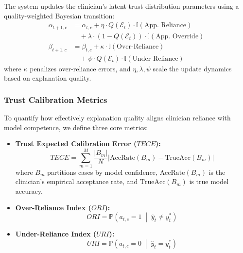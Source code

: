 \documentclass[10pt,journal,compsoc]{IEEEtran}
\begin{document}
The system updates the clinician's latent trust distribution parameters using a quality-weighted Bayesian transition:
\begin{align}
\alpha_{t+1, c} &= \alpha_{t, c} + \eta \cdot Q(\mathcal{E}_t) \cdot \mathbb{I}(\text{App. Reliance}) \nonumber \\
&\quad + \lambda \cdot (1 - Q(\mathcal{E}_t)) \cdot \mathbb{I}(\text{App. Override}) \\
\beta_{t+1, c} &= \beta_{t, c} + \kappa \cdot \mathbb{I}(\text{Over-Reliance}) \nonumber \\
&\quad + \psi \cdot Q(\mathcal{E}_t) \cdot \mathbb{I}(\text{Under-Reliance})
\end{align}
where $\kappa$ penalizes over-reliance errors, and $\eta, \lambda, \psi$ scale the update dynamics based on explanation quality.

\subsubsection{Trust Calibration Metrics}
To quantify how effectively explanation quality aligns clinician reliance with model competence, we define three core metrics:
\begin{itemize}
    \item \textbf{Trust Expected Calibration Error ($TECE$):}
    \begin{equation}
    TECE = \sum_{m=1}^M \frac{|B_m|}{N} \left| \text{AccRate}(B_m) - \text{TrueAcc}(B_m) \right|
    \end{equation}
    where $B_m$ partitions cases by model confidence, $\text{AccRate}(B_m)$ is the clinician's empirical acceptance rate, and $\text{TrueAcc}(B_m)$ is true model accuracy.
    
    \item \textbf{Over-Reliance Index ($ORI$):}
    \begin{equation}
    ORI = \mathbb{P}\left( a_{t, c} = 1 \;\middle|\; \hat{y}_t \ne y^*_t \right)
    \end{equation}
    
    \item \textbf{Under-Reliance Index ($URI$):}
    \begin{equation}
    URI = \mathbb{P}\left( a_{t, c} = 0 \;\middle|\; \hat{y}_t = y^*_t \right)
    \end{equation}
\end{itemize}
\end{document}
